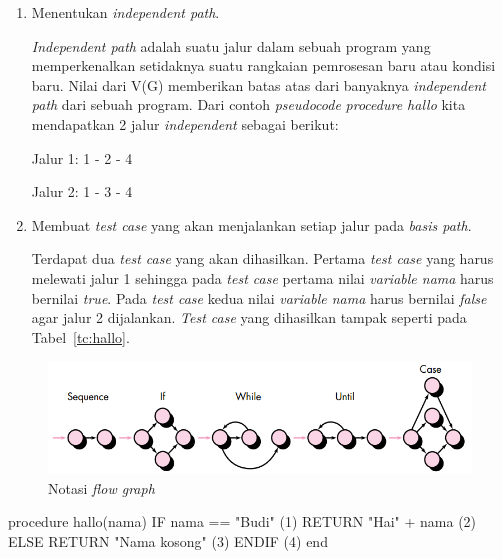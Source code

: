 \begin{enumerate}[
leftmargin=0pt, itemindent=20pt,
labelwidth=15pt, labelsep=5pt, listparindent=0.7cm,
align=left]
\item Menentukan \emph{independent path}.

  \emph{Independent path} adalah suatu jalur dalam sebuah program yang
  memperkenalkan setidaknya suatu rangkaian pemrosesan baru atau
  kondisi baru. Nilai dari V(G) memberikan batas atas dari banyaknya
  \emph{independent path} dari sebuah program. Dari contoh
  \emph{pseudocode} \emph{procedure hallo} kita mendapatkan 2 jalur
  \emph{independent} sebagai berikut: \par\null\par

  Jalur 1: 1 - 2 - 4 \par
  Jalur 2: 1 - 3 - 4

\item Membuat \emph{test case} yang akan menjalankan setiap jalur pada
  \emph{basis path}.

  Terdapat dua \emph{test case} yang akan dihasilkan. Pertama
  \emph{test case} yang harus melewati jalur 1 sehingga pada \emph{test
    case} pertama nilai \emph{variable nama} harus bernilai
  \emph{true}. Pada \emph{test case} kedua nilai \emph{variable nama}
  harus bernilai \emph{false} agar jalur 2 dijalankan. \emph{Test case}
  yang dihasilkan tampak seperti pada Tabel~\ref{tc:hallo}.

\end{enumerate}

\begin{figure}[H]
  \centering
  \includegraphics[width=.8\linewidth]{img/notasi-flow-graph}
  \caption{Notasi \emph{flow graph} \parencite{presman2010software}}\label{fig:notasi-flow-graph}
\end{figure}


\begin{center}
\begin{minipage}{0.8\textwidth}
\begin{code}
\begin{ignasicblock}[title=hallo,minted language=text]
procedure hallo(nama)
   IF nama == "Budi"          (1)
      RETURN "Hai" + nama     (2)
   ELSE
      RETURN "Nama kosong"    (3)
   ENDIF                      (4)
end
\end{ignasicblock}
\label{ps:hallo}
\end{code}
\end{minipage}
\end{center}

